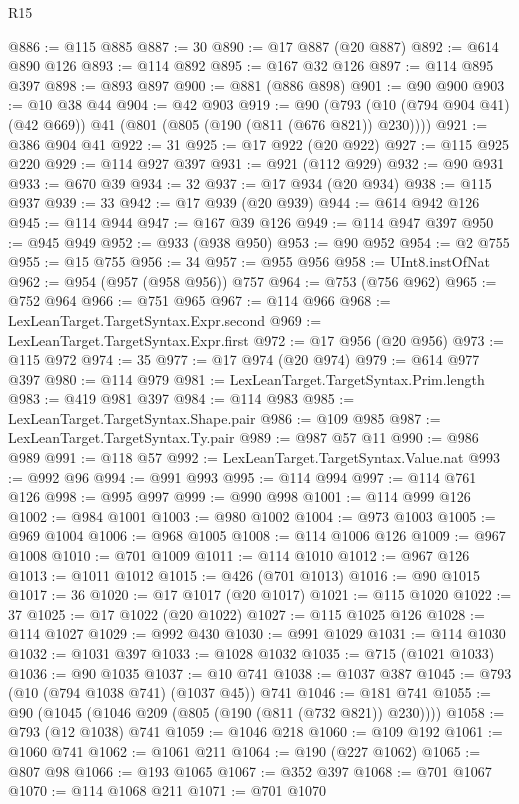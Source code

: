 \begin{lexlean}{R15}
\begin{coremodule}
@886 := @115 @885
@887 := 30
@890 := @17 @887 (@20 @887)
@892 := @614 @890 @126
@893 := @114 @892
@895 := @167 @32 @126
@897 := @114 @895 @397
@898 := @893 @897
@900 := @881 (@886 @898)
@901 := @90 @900
@903 := @10 @38 @44
@904 := @42 @903
@919 := @90 (@793 (@10 (@794 @904 @41) (@42 @669)) @41 (@801 (@805 (@190 (@811 (@676 @821)) @230))))
@921 := @386 @904 @41
@922 := 31
@925 := @17 @922 (@20 @922)
@927 := @115 @925 @220
@929 := @114 @927 @397
@931 := @921 (@112 @929)
@932 := @90 @931
@933 := @670 @39
@934 := 32
@937 := @17 @934 (@20 @934)
@938 := @115 @937
@939 := 33
@942 := @17 @939 (@20 @939)
@944 := @614 @942 @126
@945 := @114 @944
@947 := @167 @39 @126
@949 := @114 @947 @397
@950 := @945 @949
@952 := @933 (@938 @950)
@953 := @90 @952
@954 := @2 @755
@955 := @15 @755
@956 := 34
@957 := @955 @956
@958 := UInt8.instOfNat
@962 := @954 (@957 (@958 @956)) @757
@964 := @753 (@756 @962)
@965 := @752 @964
@966 := @751 @965
@967 := @114 @966
@968 := LexLeanTarget.TargetSyntax.Expr.second
@969 := LexLeanTarget.TargetSyntax.Expr.first
@972 := @17 @956 (@20 @956)
@973 := @115 @972
@974 := 35
@977 := @17 @974 (@20 @974)
@979 := @614 @977 @397
@980 := @114 @979
@981 := LexLeanTarget.TargetSyntax.Prim.length
@983 := @419 @981 @397
@984 := @114 @983
@985 := LexLeanTarget.TargetSyntax.Shape.pair
@986 := @109 @985
@987 := LexLeanTarget.TargetSyntax.Ty.pair
@989 := @987 @57 @11
@990 := @986 @989
@991 := @118 @57
@992 := LexLeanTarget.TargetSyntax.Value.nat
@993 := @992 @96
@994 := @991 @993
@995 := @114 @994
@997 := @114 @761 @126
@998 := @995 @997
@999 := @990 @998
@1001 := @114 @999 @126
@1002 := @984 @1001
@1003 := @980 @1002
@1004 := @973 @1003
@1005 := @969 @1004
@1006 := @968 @1005
@1008 := @114 @1006 @126
@1009 := @967 @1008
@1010 := @701 @1009
@1011 := @114 @1010
@1012 := @967 @126
@1013 := @1011 @1012
@1015 := @426 (@701 @1013)
@1016 := @90 @1015
@1017 := 36
@1020 := @17 @1017 (@20 @1017)
@1021 := @115 @1020
@1022 := 37
@1025 := @17 @1022 (@20 @1022)
@1027 := @115 @1025 @126
@1028 := @114 @1027
@1029 := @992 @430
@1030 := @991 @1029
@1031 := @114 @1030
@1032 := @1031 @397
@1033 := @1028 @1032
@1035 := @715 (@1021 @1033)
@1036 := @90 @1035
@1037 := @10 @741
@1038 := @1037 @387
@1045 := @793 (@10 (@794 @1038 @741) (@1037 @45)) @741
@1046 := @181 @741
@1055 := @90 (@1045 (@1046 @209 (@805 (@190 (@811 (@732 @821)) @230))))
@1058 := @793 (@12 @1038) @741
@1059 := @1046 @218
@1060 := @109 @192
@1061 := @1060 @741
@1062 := @1061 @211
@1064 := @190 (@227 @1062)
@1065 := @807 @98
@1066 := @193 @1065
@1067 := @352 @397
@1068 := @701 @1067
@1070 := @114 @1068 @211
@1071 := @701 @1070

\end{coremodule}
\end{lexlean}
